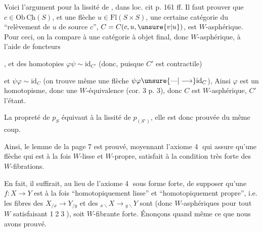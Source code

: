 
Voici l'argument pour la lissité de , dans loc. cit p. 161 ff. Il faut prouver que   $c\in\mathrm{Ob}\,\underline{\mathrm{Ch}}(S)$,  et une flèche $u\in\mathrm{Fl}(S\times S)$, une certaine catégorie du ``relèvement de $u$ de source $c$'', $C=C(c,u,\unsure{v|u})$, est $W$-asphérique. Pour ceci, on la compare à une catégorie  à objet final, donc  $W$-asphérique, à l'aide de  foncteurs


, et des homotopies $\varphi\psi\sim\mathrm{id}_{C'}$ (donc, puisque $C'$ est contractile)

et $\psi\varphi\sim\mathrm{id}_C$ (on trouve même une flèche $\psi\varphi\unsure{\text{---}|\longrightarrow}\mathrm{id}_C$), Ainsi $\varphi$ est un homotopisme, donc une $W$-équivalence (cor. 3 p. 3), donc $C$ est $W$-asphérique, $C'$ l'étant.

La propreté de $p_S$ équivaut à la lissité de $p_{(S^\circ)}$, elle est donc prouvée du même coup.

Ainsi, le lemme de la page 7 est prouvé, moyennant l'axiome \textcircled{4} qui assure qu'une flèche qui est à la fois $W$-lisse et $W$-propre, satisfait à la condition très forte  des $W$-fibrations.


En fait, il suffirait, au lieu de l'axiome \textcircled{4} sous  forme forte, de supposer qu'une $f:X\longrightarrow Y$  est à la fois ``homotopiquement lisse'' et ``homotopiquement propre'', i.e. les fibres des $X_{/x}\longrightarrow Y_{/y}$ et des $ {}_{x\backslash}X\longrightarrow{}_{y\backslash}Y$ sont  (donc $W$-asphériques pour tout $W$ satisfaisant \textcircled{1}\textcircled{2}\textcircled{3}), soit $W$-fibrante forte. Énonçons quand même ce que nous avons prouvé.

